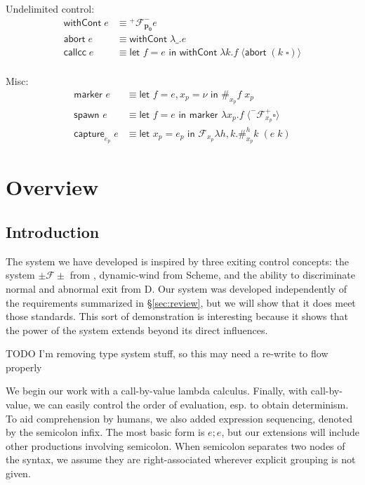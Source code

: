 \documentclass[11pt]{article}
\newcommand\x{\lambda x}
\newcommand{\letin}[2]{\textsf{let }#1\textsf{ in }#2}
\newcommand\F{\mathcal{F}}
\newcommand{\angles}[1]{\langle#1\rangle}
\begin{document}
Undelimited control:
\begin{align*}
\textsf{withCont}\;e &\equiv
	{}^+\F^-_\mathbf{p_0}e
	\\
\textsf{abort}\;e &\equiv
	\textsf{withCont}\;\lambda \_.e
	\\
\textsf{callcc}\;e &\equiv
	\letin{f=e}{\textsf{withCont}\;\lambda k. f\; \angles{\textsf{abort}\;(k\;\square)}}
	\\
\end{align*}

Misc:
\begin{align*}
\textsf{marker }e &\equiv
	\letin{f=e, x_p=\nu}{\#_{x_p}f\;x_p}
	\\
\textsf{spawn }e &\equiv
	\letin{f=e}{\textsf{marker }\x_p.f\;\angles{^-\F^+_{x_p}\square}}
	\\
\textsf{capture}_{e_p}\;e &\equiv
	\letin{x_p=e_p}{\F_{x_p}\lambda h,k.\#_{x_p}^hk\;(e\;k)}
\end{align*}






\section{Overview}
\label{system-overview}

\subsection{Introduction}

The system we have developed is inspired by three exiting control concepts: the system $\pm\mathcal{F}\pm$ from \cite{MFDC}, dynamic-wind from Scheme, and the ability to discriminate normal and abnormal exit from D.
Our system was developed independently of the requirements summarized in \S\ref{sec:review}, but we will show that it does meet those standards.
This sort of demonstration is interesting because it shows that the power of the system extends beyond its direct influences.

TODO I'm removing type system stuff, so this may need a re-write to flow properly

We begin our work with a call-by-value lambda calculus.
Finally, with call-by-value, we can easily control the order of evaluation, esp. to obtain determinism.
To aid comprehension by humans, we also added expression sequencing, denoted by the semicolon infix.
The most basic form is $e; e$, but our extensions will include other productions involving semicolon.
When semicolon separates two nodes of the syntax, we assume they are right-associated wherever explicit grouping is not given.
\end{document}
